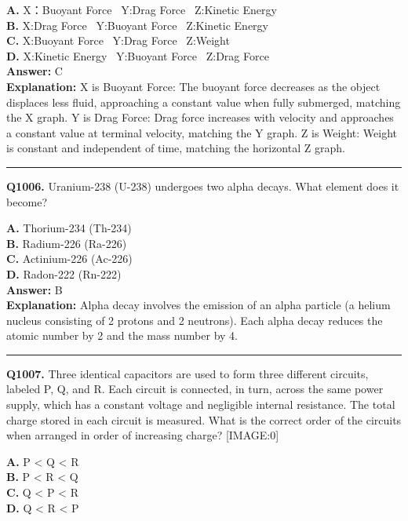 \documentclass[12pt]{article}
\begin{document}
\textbf{A.} X：Buoyant Force  Y:Drag Force  Z:Kinetic Energy \\
\textbf{B.} X:Drag Force  Y:Buoyant Force  Z:Kinetic Energy \\
\textbf{C.} X:Buoyant Force  Y:Drag Force  Z:Weight \\
\textbf{D.} X:Kinetic Energy  Y:Buoyant Force  Z:Drag Force \\

\textbf{Answer:} C \\
\textbf{Explanation:} \cdot 
X is Buoyant Force: The buoyant force decreases as the object displaces less fluid, approaching a constant value when fully submerged, matching the X graph.
\cdot 
Y is Drag Force: Drag force increases with velocity and approaches a constant value at terminal velocity, matching the Y graph.
\cdot 
Z is Weight: Weight is constant and independent of time, matching the horizontal Z graph.

\hrule
\vspace{1em}


\noindent
\textbf{Q1006.} Uranium-238 (U-238) undergoes two alpha decays. What element does it become?



\textbf{A.} Thorium-234 (Th-234) \\
\textbf{B.} Radium-226 (Ra-226) \\
\textbf{C.} Actinium-226 (Ac-226) \\
\textbf{D.} Radon-222 (Rn-222) \\

\textbf{Answer:} B \\
\textbf{Explanation:} Alpha decay involves the emission of an alpha particle (a helium nucleus consisting of 2 protons and 2 neutrons). Each alpha decay reduces the atomic number by 2 and the mass number by 4.

\hrule
\vspace{1em}


\noindent
\textbf{Q1007.} Three identical capacitors are used to form three different circuits, labeled P, Q, and R. Each circuit is connected, in turn, across the same power supply, which has a constant voltage and negligible internal resistance. The total charge stored in each circuit is measured. What is the correct order of the circuits when arranged in order of increasing charge?
[IMAGE:0]



\textbf{A.} P < Q < R \\
\textbf{B.} P < R < Q \\
\textbf{C.} Q < P < R \\
\textbf{D.} Q < R < P \\
\end{document}
